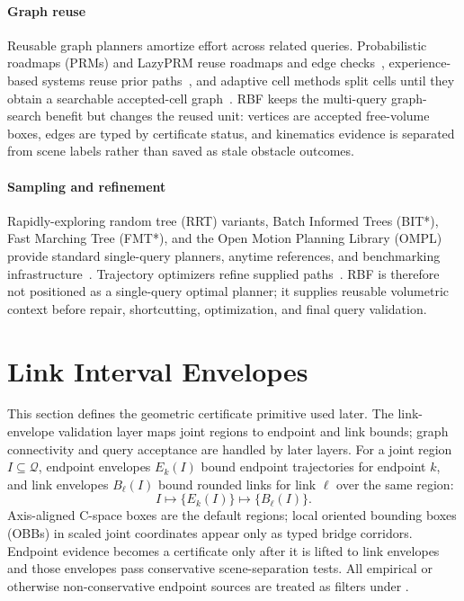 \documentclass[journal]{IEEEtran}
\DeclareRobustCommand{\textsc}[1]{\textnormal{\MakeUppercase{#1}}}
\newcommand{\rbf}{\textsc{RBF}}
\newcommand{\Q}{\ensuremath{\mathcal{Q}}}
\newcommand{\cspace}{\mbox{C-space}}
\begin{document}
\paragraph{Graph reuse}
Reusable graph planners amortize effort across related queries. Probabilistic
roadmaps (PRMs) and LazyPRM reuse roadmaps and edge checks~\cite{kavraki1996probabilistic,bohlin2000path,
dellin2016unifying,schmerling2015optimal}, experience-based systems reuse prior
paths~\cite{coleman2014moveit}, and adaptive cell methods split cells until
they obtain a searchable accepted-cell graph~\cite{lozanoperez1983spatial,
brooks1985subdivision}. \rbf{} keeps the multi-query graph-search benefit but
changes the reused unit: vertices are accepted free-volume boxes, edges are
typed by certificate status, and kinematics evidence is separated from scene
labels rather than saved as stale obstacle outcomes.

\paragraph{Sampling and refinement}
Rapidly-exploring random tree (RRT) variants, Batch Informed Trees (BIT*),
Fast Marching Tree (FMT*), and the Open Motion Planning Library (OMPL) provide
standard single-query planners, anytime references, and benchmarking
infrastructure~\cite{karaman2011sampling,kuffner2000rrt,
gammell2015batch,gammell2018informed,janson2015fmt,sucan2012ompl,
moll2015benchmarking}. Trajectory optimizers refine supplied
paths~\cite{ratliff2009chomp,kalakrishnan2011stomp,schulman2014motion,
mukadam2018gpmp2}. \rbf{} is therefore not positioned as a single-query optimal planner;
it supplies reusable volumetric context before repair, shortcutting,
optimization, and final query validation.

\section{Link Interval Envelopes}\label{sec:link_envelopes}

This section defines the geometric certificate primitive used later. The
link-envelope validation layer maps joint regions to endpoint and link bounds;
graph connectivity and query acceptance are handled by later layers. For a
joint region
$I\subseteq\Q$, endpoint envelopes $E_k(I)$ bound endpoint trajectories for
endpoint $k$, and link envelopes $B_\ell(I)$ bound rounded links for link
$\ell$ over the same region:
\[
I \mapsto \{E_k(I)\} \mapsto \{B_\ell(I)\}.
\]
Axis-aligned \cspace{} boxes are the default regions; local oriented bounding
boxes (OBBs) in scaled joint coordinates appear only as typed bridge corridors.
Endpoint evidence becomes a certificate only after it is lifted to link
envelopes and those envelopes pass conservative scene-separation tests. All
empirical or otherwise non-conservative endpoint sources are treated as filters
under .
\end{document}
